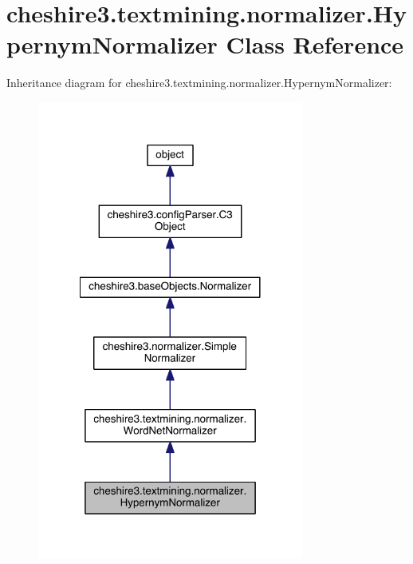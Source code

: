 \hypertarget{classcheshire3_1_1textmining_1_1normalizer_1_1_hypernym_normalizer}{\section{cheshire3.\-textmining.\-normalizer.\-Hypernym\-Normalizer Class Reference}
\label{classcheshire3_1_1textmining_1_1normalizer_1_1_hypernym_normalizer}
}


Inheritance diagram for cheshire3.\-textmining.\-normalizer.\-Hypernym\-Normalizer\-:
\nopagebreak
\begin{figure}[H]
\begin{center}
\leavevmode
\includegraphics[width=248pt]{classcheshire3_1_1textmining_1_1normalizer_1_1_hypernym_normalizer__inherit__graph}
\end{center}
\end{figure}


